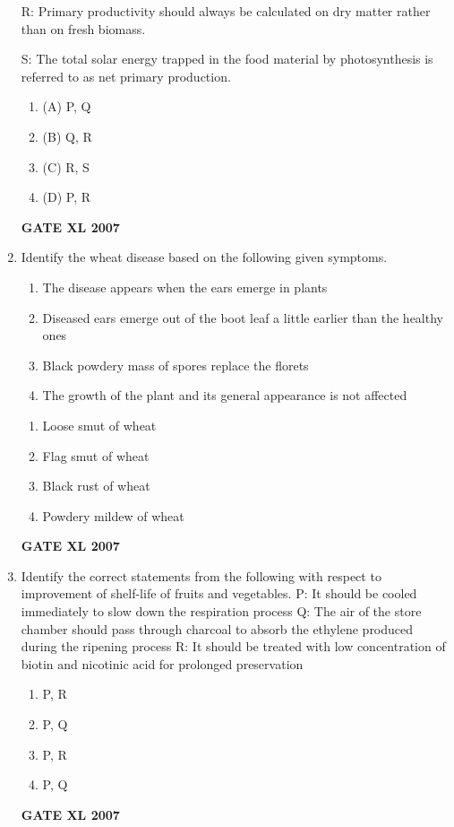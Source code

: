 \documentclass[journal,12pt,onecolumn]{IEEEtran}
\begin{document}
\begin{enumerate}
    R: Primary productivity should always be calculated on dry matter rather than on fresh biomass. 

    S: The total solar energy trapped in the food material by photosynthesis is referred to as net primary production.
    \begin{enumerate}
        \item (A) P, Q
        \item (B) Q, R
        \item (C) R, S
        \item (D) P, R
    \end{enumerate}\hfill{\textbf{GATE XL 2007}}

\item Identify the wheat disease based on the following given symptoms.
    \begin{enumerate}
        \item The disease appears when the ears emerge in plants
        \item Diseased ears emerge out of the boot leaf a little earlier than the healthy ones
        \item Black powdery mass of spores replace the florets
        \item The growth of the plant and its general appearance is not affected
    \end{enumerate}
    \begin{enumerate}
        \item Loose smut of wheat
        \item Flag smut of wheat
        \item Black rust of wheat
        \item Powdery mildew of wheat
    \end{enumerate}\hfill{\textbf{GATE XL 2007}}

    \item Identify the correct statements from the following with respect to improvement of shelf-life of fruits and vegetables.
		    P: It should be cooled immediately to slow down the respiration process
        Q: The air of the store chamber should pass through charcoal to absorb the ethylene produced during the ripening process
        R: It should be treated with low concentration of biotin and nicotinic acid for prolonged preservation
    \begin{enumerate}
        \item P, R
        \item P, Q
        \item P, R
        \item P, Q
    \end{enumerate}\hfill{\textbf{GATE XL 2007}}


\end{enumerate}
\end{document}
